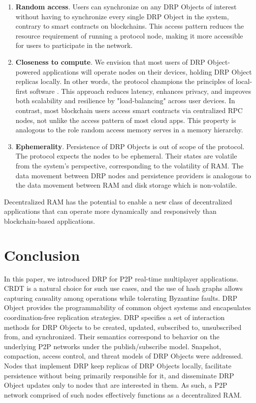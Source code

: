\documentclass{article}
\begin{document}
\begin{enumerate}
    \item \textbf{Random access}. Users can synchronize on any DRP Objects of interest without having to synchronize every single DRP Object in the system, contrary to smart contracts on blockchains. This access pattern reduces the resource requirement of running a protocol node, making it more accessible for users to participate in the network.
    \item \textbf{Closeness to compute}. We envision that most users of DRP Object-powered applications will operate nodes on their devices, holding DRP Object replicas locally. In other words, the protocol champions the principles of local-first software \cite{LoFi}. This approach reduces latency, enhances privacy, and improves both scalability and resilience by "load-balancing" across user devices. In contrast, most blockchain users access smart contracts via centralized RPC nodes, not unlike the access pattern of most cloud apps. This property is analogous to the role random access memory serves in a memory hierarchy.
    \item \textbf{Ephemerality}. Persistence of DRP Objects is out of scope of the protocol. The protocol expects the nodes to be ephemeral. Their states are volatile from the system's perspective, corresponding to the volatility of RAM. The data movement between DRP nodes and persistence providers is analogous to the data movement between RAM and disk storage which is non-volatile.
\end{enumerate}
\noindent

Decentralized RAM has the potential to enable a new class of decentralized applications that can operate more dynamically and responsively than blockchain-based applications.

\section{Conclusion}

In this paper, we introduced DRP for P2P real-time multiplayer applications. CRDT is a natural choice for such use cases, and the use of hash graphs allows capturing causality among operations while tolerating Byzantine faults. DRP Object provides the programmability of common object systems and encapsulates coordination-free replication strategies. DRP specifies a set of interaction methods for DRP Objects to be created, updated, subscribed to, unsubscribed from, and synchronized. Their semantics correspond to behavior on the underlying P2P networks under the publish/subscribe model. Snapshot, compaction, access control, and threat models of DRP Objects were addressed. Nodes that implement DRP keep replicas of DRP Objects locally, facilitate persistence without being primarily responsible for it, and disseminate DRP Object updates only to nodes that are interested in them. As such, a P2P network comprised of such nodes effectively functions as a decentralized RAM.
\end{document}
